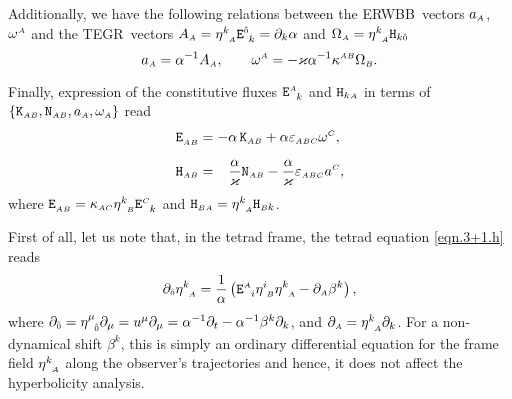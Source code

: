 \documentclass[
10pt, %
a4paper, %
oneside, %
twocolumn,
headinclude,footinclude, %
BCOR5mm, %
]{scrartcl}
\newcommand{\ERWBB}{{ERWBB}}
\newcommand{\sA}{\mathsmaller A}
\newcommand{\sB}{\mathsmaller B}
\newcommand{\sC}{\mathsmaller C}
\newcommand{\pd}[1]{\partial_{#1}}
\newcommand{\mg}[1]{\kappa_{#1}}			%
\newcommand{\MG}[1]{\kappa^{#1}}			%
\newcommand{\itetrsymbol}{\eta}
\newcommand{\itetr}[2]{\itetrsymbol^{#1}_{\phantom{#1}#2}}
\newcommand{\Hfin}[2]{\mathtt{H}_{#2#1}}	%
\newcommand{\Efin}[2]{\mathtt{E}^{#1}_{\phantom{#1}#2}}	%
\newcommand{\Kbuch}[2]{\mathtt{K}_{{#1}{#2}}}	%
\newcommand{\Nbuchdown}[2]{\mathtt{N}_{#1#2}}	%
\newcommand{\LCtens}{\varepsilon} %
\newcommand{\tegr}{TEGR}
\newcommand{\indalg}[1]{\hat{\mathsmaller{#1}}}
\newcommand{\lapse}{\alpha}
\newcommand{\shift}[1]{\beta^{#1}}
\begin{document}
	Additionally, we have the following relations between the \ERWBB\ vectors $
	a_{\sA} $, $ \omega^{\sA} $ and the \tegr\ vectors $
	A_{\sA}=\itetr{k}{\sA}\Efin{\indalg{0}}{k} = \pd{k}\lapse $ and $ \Omega_{\sA} =
	\itetr{k}{\sA}\Hfin{\indalg{0}}{k} $
	\begin{equation}\label{eqn.Buchman.TEGR.AW}
		a_{\sA} = \lapse^{-1} A_{\sA},
		\qquad
		\omega^{\sA} =-\varkappa \lapse^{-1} \MG{\sA\sB} \Omega_{\sB}.
	\end{equation}
	
	Finally, expression of the 
	constitutive fluxes $ \Efin{\sA}{k} $ and $ \Hfin{\sA}{k} $ in terms of $ 
	\{\Kbuch{\sA}{\sB},\Nbuchdown{\sA}{\sB},a_{\sA},\omega_{\sA}\} $ read
	\begin{subequations}\label{eqn.const.KN}
		\begin{align}
			\Efin{}{\sA\sB} &=
			- \lapse \,\Kbuch{\sA}{\sB} 
			+ \lapse \LCtens_{\sA\sB\sC} \omega^\sC ,
			\\[2mm]
			\Hfin{\sB}{\sA} &= 
			\phantom{-}\frac{\lapse}{\varkappa} \Nbuchdown{\sA}{\sB} 
			- \frac{\lapse}{\varkappa} 
			\LCtens_{\sA\sB\sC} a^\sC ,
		\end{align}
	\end{subequations}
	where $\Efin{}{\sA\sB} = \mg{\sA\sC}\itetr{k}{\sB}\Efin{\sC}{k}$ and $\Hfin{\sA}{\sB} = \itetr{k}{\sA}\Hfin{k}{\sB}$.
	
	First of all, let us note that, in the tetrad frame, the tetrad equation \eqref{eqn.3+1.h} reads
	\begin{equation}
		\pd{\indalg{0}} \itetr{k}{\sA} = \frac{1}{\lapse} \left( \Efin{\sA}{i}\itetr{i}{\sB}\itetr{k}{\sA} - \pd{\sA} \shift{k} \right),
	\end{equation}
	where $ \pd{\indalg{0}} = \itetr{\mu}{\indalg{0}}\pd{\mu} = u^\mu\pd{\mu} =
	\lapse^{-1}\pd{t} - \lapse^{-1}\shift{k}\pd{k}$, and $ \pd{\sA} =
	\itetr{k}{\sA}\pd{k} $. For a non-dynamical shift $ \shift{k} $, this is
	simply an ordinary differential equation for the frame field $
	\itetr{k}{\sA} $ along the observer's trajectories and hence, it does not
	affect the hyperbolicity analysis.
\end{document}
